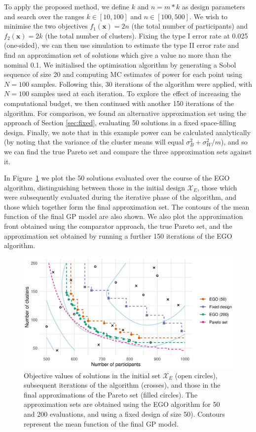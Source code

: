 \documentclass[sagev, Crown]{sagej}
\begin{document}
To apply the proposed method, we define $k$ and $n = m*k$ as design parameters and search over the ranges $k \in [10, 100]$ and $n \in [100, 500]$. We wish to minimise the two objectives $f_1(\mathbf{x}) = 2n$ (the total number of participants) and $f_2(\mathbf{x}) = 2k$ (the total number of clusters). Fixing the type I error rate at 0.025 (one-sided), we can then use simulation to estimate the type II error rate and find an approximation set of solutions which give a value no more than the nominal 0.1. We initialised the optimisation algorithm by generating a Sobol sequence of size 20 and computing MC estimates of power for each point using $N = 100$ samples. Following this, 30 iterations of the algorithm were applied, with $N = 100$ samples used at each iteration. To explore the effect of increasing the computational budget, we then continued with another 150 iterations of the algorithm. For comparison, we found an alternative approximation set using the approach of Section \ref{sec:fixed}, evaluating 50 solutions in a fixed space-filling design.  Finally, we note that in this example power can be calculated analytically (by noting that the variance of the cluster means will equal $\sigma_B^2 + \sigma_W^2/m$), and so we can find the true Pareto set and compare the three approximation sets against it.

In Figure~\ref{fig:ex4_single_run} we plot the 50 solutions evaluated over the course of the EGO algorithm, distinguishing between those in the initial design $\mathcal{X}_{E}$, those which were subsequently evaluated during the iterative phase of the algorithm, and those which together form the final approximation set. The contours of the mean function of the final GP model are also shown. We also plot the approximation front obtained using the comparator approach, the true Pareto set, and the approximation set obtained by running a further 150 iterations of the EGO algorithm.

\begin{figure}
\centering
\includegraphics[scale=0.8]{./figures/ex4_single_run.eps}
\caption{Objective values of solutions in the initial set $\mathcal{X}_{E}$ (open circles), subsequent iterations of the algorithm (crosses), and those in the final approximations of the Pareto set (filled circles). The approximation sets are obtained using the EGO algorithm for 50 and 200 evaluations, and using a fixed design of size 50). Contours represent the mean function of the final GP model.}
\label{fig:ex4_single_run}
\end{figure}
\end{document}
